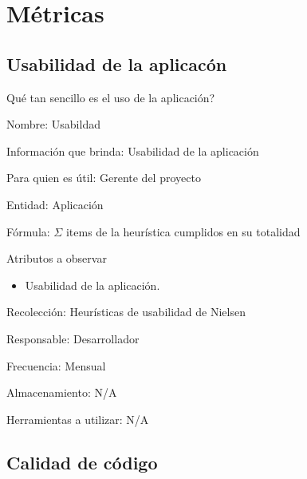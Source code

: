 \section{Métricas}


\subsection{Usabilidad de la aplicacón}

 {
    \pregunta Qué tan sencillo es el uso de la aplicación?
} {
     {
        \item Nombre: Usabildad
        \item Información que brinda: Usabilidad de la aplicación
        \item Para quien es útil: Gerente del proyecto
        \item Entidad: Aplicación
        \item Fórmula: $\Sigma$ items de la heurística cumplidos en su totalidad
        \item Atributos a observar
            \begin{itemize}
                \item Usabilidad de la aplicación.
            \end{itemize}
        \item Recolección: Heurísticas de usabilidad de Nielsen
        \item Responsable: Desarrollador
        \item Frecuencia: Mensual
        \item Almacenamiento: N/A
        \item Herramientas a utilizar: N/A
    }
}

\subsection{Calidad de código}

